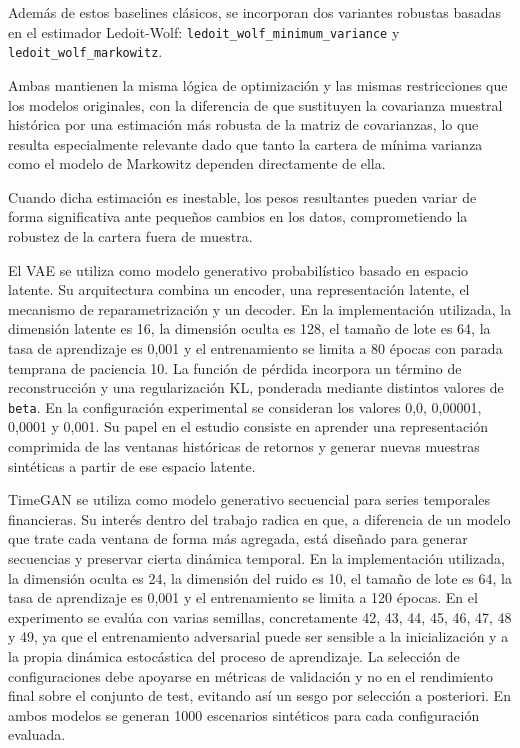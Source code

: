 \documentclass[11pt,a4paper,spanish,oneside]{book}
\numberwithin{equation}{chapter}
\numberwithin{figure}{chapter}
\begin{document}
Además de estos baselines clásicos, se incorporan dos variantes robustas basadas en el estimador Ledoit-Wolf: \texttt{ledoit\_wolf\_minimum\_variance} y \texttt{ledoit\_wolf\_markowitz}. 

Ambas mantienen la misma lógica de optimización y las mismas restricciones que los modelos originales, con la diferencia de que sustituyen la covarianza muestral histórica por una estimación más robusta de la matriz de covarianzas, lo que resulta especialmente relevante dado que tanto la cartera de mínima varianza como el modelo de Markowitz dependen directamente de ella. 

Cuando dicha estimación es inestable, los pesos resultantes pueden variar de forma significativa ante pequeños cambios en los datos, comprometiendo la robustez de la cartera fuera de muestra.

El VAE se utiliza como modelo generativo probabilístico basado en espacio latente. Su arquitectura combina un encoder, una representación latente, el mecanismo de reparametrización y un decoder. En la implementación utilizada, la dimensión latente es 16, la dimensión oculta es 128, el tamaño de lote es 64, la tasa de aprendizaje es 0,001 y el entrenamiento se limita a 80 épocas con parada temprana de paciencia 10. La función de pérdida incorpora un término de reconstrucción y una regularización KL, ponderada mediante distintos valores de \texttt{beta}. En la configuración experimental se consideran los valores 0,0, 0,00001, 0,0001 y 0,001. Su papel en el estudio consiste en aprender una representación comprimida de las ventanas históricas de retornos y generar nuevas muestras sintéticas a partir de ese espacio latente.

TimeGAN se utiliza como modelo generativo secuencial para series temporales financieras. Su interés dentro del trabajo radica en que, a diferencia de un modelo que trate cada ventana de forma más agregada, está diseñado para generar secuencias y preservar cierta dinámica temporal. En la implementación utilizada, la dimensión oculta es 24, la dimensión del ruido es 10, el tamaño de lote es 64, la tasa de aprendizaje es 0,001 y el entrenamiento se limita a 120 épocas. En el experimento se evalúa con varias semillas, concretamente 42, 43, 44, 45, 46, 47, 48 y 49, ya que el entrenamiento adversarial puede ser sensible a la inicialización y a la propia dinámica estocástica del proceso de aprendizaje. La selección de configuraciones debe apoyarse en métricas de validación y no en el rendimiento final sobre el conjunto de test, evitando así un sesgo por selección a posteriori. En ambos modelos se generan 1000 escenarios sintéticos para cada configuración evaluada.
\end{document}
